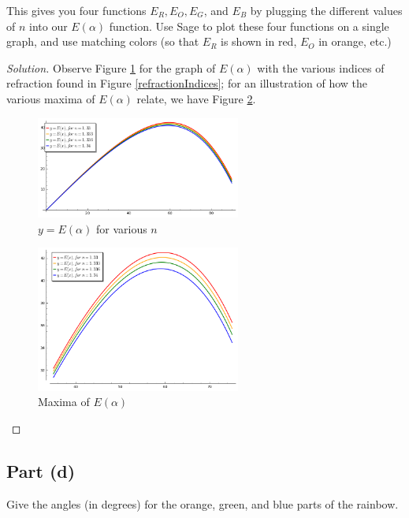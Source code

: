 \documentclass[letterpaper, 12pt]{amsart}
\theoremstyle{definition}  %
\begin{document}
		This gives you four functions $E_{R}, E_{O}, E_{G}$, and $E_{B}$ by plugging the different values of $n$ into our $E(\alpha)$ function. 
		Use Sage to plot these four functions on a single graph, and use matching colors (so that $E_{R}$ is shown in red, $E_{O}$ in orange, etc.)

		\begin{proof}[Solution]
		Observe Figure \ref{rainbowGraph} for the graph of $E(\alpha)$ with the various indices of refraction found in Figure \ref{refractionIndices}; for an illustration of how the various maxima of $E(\alpha)$ relate, we have Figure \ref{raibowZoom}.

			\begin{figure}[h]
				\includegraphics[width=0.6\textwidth]{figs/e.png}
				\caption{$y = E(\alpha)$ for various $n$}
				\label{rainbowGraph}
			\end{figure}

			\begin{figure}[h]
				\includegraphics[width=0.6\textwidth]{figs/f.png}
				\caption{Maxima of $E(\alpha)$}
				\label{raibowZoom}
			\end{figure}
		\end{proof}

		\subsection*{Part (d)}
		Give the angles (in degrees) for the orange, green, and blue parts of the rainbow.
\end{document}
